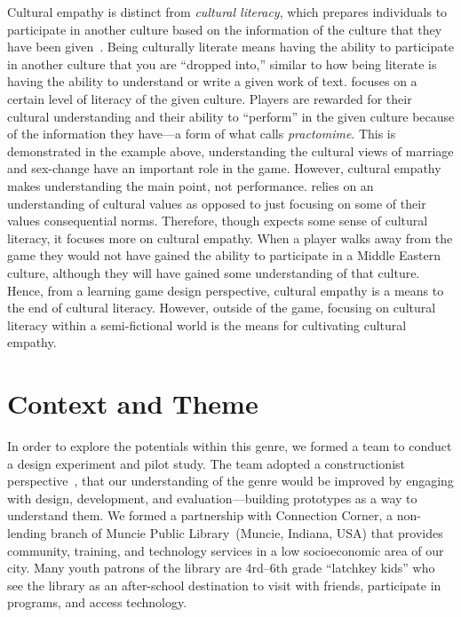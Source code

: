 \documentclass[a4paper]{article}
\begin{document}
Cultural empathy is distinct from \textit{cultural
literacy}, which prepares individuals to participate in another culture
based on the information of the culture that they have been 
given~\citep[p.165]{Hirsch1983}. Being culturally literate means having the
ability to participate in another culture that you are
``dropped into,'' similar to how being literate is having the ability to
understand or write a given work of text.  \totan{} focuses on a certain
level of literacy of the given culture. Players are rewarded for their
cultural understanding and their ability to ``perform'' in the given
culture because of the information they have---a form of what
\citet{Travis2011} calls \textit{practomime}.
This is demonstrated in
the example above, understanding the cultural views of marriage and
sex-change have an important role in the game. However, cultural
empathy makes understanding the main point, not
performance. \totan{} relies on an understanding of cultural values as
opposed to just focusing on some of their values consequential
norms. Therefore, though \totan{} expects some sense of cultural
literacy, it focuses more on cultural empathy. When a player walks
away from the game they would not have gained the ability to
participate in a Middle Eastern culture,
although they will have gained some understanding of that culture. 
Hence, from a learning game design perspective,
cultural empathy is a means to the end of cultural
literacy. However, outside of the game, focusing on cultural literacy
within a semi-fictional world is the means for cultivating
cultural empathy.

\section{Context and Theme}

In order to explore the potentials within this genre,
we formed a team to conduct a design experiment and pilot study.
The team adopted a constructionist perspective~\citep{Papert2001},
that our understanding of the genre would be improved by engaging
with design, development, and evaluation---building prototypes
as a way to understand them.
We formed a partnership with Connection Corner, 
a non-lending branch of Muncie Public Library~(Muncie, Indiana, USA) that 
provides community, training, and technology services in a
low socioeconomic area of our city.
Many youth patrons of the library are 4rd--6th grade 
``latchkey kids'' who 
see the library as an after-school destination to visit with friends, 
participate in programs, and access technology.
\end{document}
